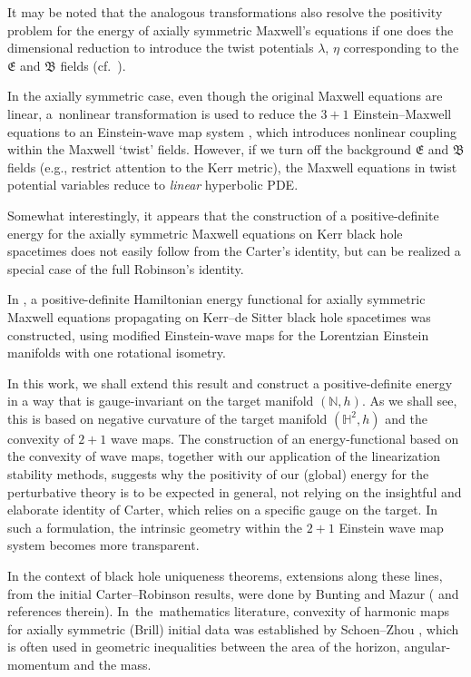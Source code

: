 \documentclass[pdftex]{sigma}
\numberwithin{equation}{section}
\begin{document}
It may be noted that the analogous transformations also resolve the positivity problem for the energy of axially symmetric Maxwell's equations if one does the dimensional reduction to introduce the twist potentials $\lambda$, $\eta$ corresponding to the $\mathfrak{E}$ and $\mathfrak{B}$ fields (cf.\ \cite{GM17_gentitle}).

In the axially symmetric case, even though the original Maxwell equations are linear, a~nonlinear transformation
is used to reduce the $3 + 1$ Einstein--Maxwell equations to an Einstein-wave map system \cite{kaluz2}, which introduces nonlinear coupling within the Maxwell `twist' fields. However, if we turn off the background $\mathfrak{E}$ and $\mathfrak{B}$ fields (e.g., restrict attention to the Kerr metric), the Maxwell equations in twist potential variables reduce to \emph{linear} hyperbolic PDE.

Somewhat interestingly, it appears that the construction of a positive-definite energy for the axially symmetric Maxwell equations on Kerr black hole spacetimes does not easily follow from the Carter's identity, but can be realized a special case of the full Robinson's identity.

In \cite{NG_17_2}, a positive-definite Hamiltonian energy functional for axially symmetric Maxwell equations propagating on Kerr--de Sitter black hole spacetimes was constructed, using modified Einstein-wave maps for the Lorentzian Einstein manifolds with one rotational isometry.

In this work, we shall extend this result and construct a positive-definite energy in a way that is gauge-invariant on the target manifold $(\mathbb{N}, h)$. As we shall see, this is based on negative curvature of the target manifold $(\mathbb{H}^2, h)$ and the convexity of $2+1$ wave maps. The construction of an energy-functional based on the convexity of wave maps, together with our application of the linearization stability methods, suggests why the positivity of our (global) energy for the perturbative theory is to be expected in general, not relying on the insightful and elaborate identity of Carter, which relies on a specific gauge on the target. In such a formulation, the intrinsic geometry within the $2 + 1$ Einstein wave map system becomes more transparent.

 In the context of black hole uniqueness theorems, extensions along these lines, from the initial Carter--Robinson results, were done by Bunting \cite{Bunt_83} and Mazur (\cite{Maz_00} and references therein). In~the~mathematics literature, convexity of harmonic maps for axially symmetric (Brill) initial data was established by Schoen--Zhou \cite{schoen-zhou_13}, which is often used in geometric inequalities between the area of the horizon, angular-momentum and the mass.
\end{document}
